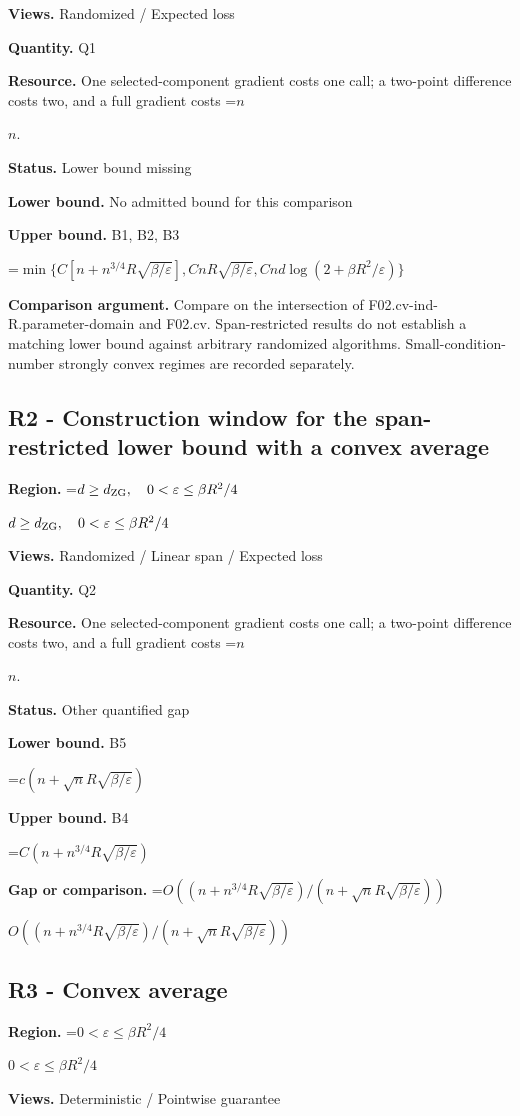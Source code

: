 \documentclass[10pt,a4paper]{article}
\newcommand{\AtlasMath}[1]{\par\begingroup\centering\setbox0=\hbox{$\displaystyle #1$}\ifdim\wd0>1.4\linewidth\typeout{ATLAS WIDE FORMULA: \the\wd0}\fi\ifdim\wd0>\linewidth\resizebox{\linewidth}{!}{\box0}\else\box0\fi\par\endgroup}
\newcommand{\AtlasInlineMath}[1]{\begingroup\setbox0=\hbox{$#1$}\ifdim\wd0>.4\linewidth\endgroup\AtlasMath{#1}\else\endgroup$#1$\fi}
\begin{document}
\textbf{Views.} Randomized / Expected loss

\textbf{Quantity.} Q1

\textbf{Resource.} One selected-component gradient costs one call; a two-point difference costs two, and a full gradient costs \AtlasInlineMath{n}.

\textbf{Status.} Lower bound missing

\textbf{Lower bound.} No admitted bound for this comparison

\textbf{Upper bound.} B1, B2, B3

\AtlasMath{\min\{C[n+n^{3/4}R\sqrt{\beta/\varepsilon}],CnR\sqrt{\beta/\varepsilon},Cnd\log(2+\beta R^2/\varepsilon)\}}
\textbf{Comparison argument.} Compare on the intersection of F02.cv-ind-R.parameter-domain and F02.cv. Span-restricted results do not establish a matching lower bound against arbitrary randomized algorithms. Small-condition-number strongly convex regimes are recorded separately.

\subsection{R2 - Construction window for the span-restricted lower bound with a convex average}
\textbf{Region.} \AtlasInlineMath{d\ge d_{\rm ZG},\quad0<\varepsilon\le\beta R^2/4}

\textbf{Views.} Randomized / Linear span / Expected loss

\textbf{Quantity.} Q2

\textbf{Resource.} One selected-component gradient costs one call; a two-point difference costs two, and a full gradient costs \AtlasInlineMath{n}.

\textbf{Status.} Other quantified gap

\textbf{Lower bound.} B5

\AtlasMath{c(n+\sqrt nR\sqrt{\beta/\varepsilon})}
\textbf{Upper bound.} B4

\AtlasMath{C(n+n^{3/4}R\sqrt{\beta/\varepsilon})}
\textbf{Gap or comparison.} \AtlasInlineMath{O((n+n^{3/4}R\sqrt{\beta/\varepsilon})/(n+\sqrt nR\sqrt{\beta/\varepsilon}))}

\subsection{R3 - Convex average}
\textbf{Region.} \AtlasInlineMath{0<\varepsilon\le\beta R^2/4}

\textbf{Views.} Deterministic / Pointwise guarantee
\end{document}
